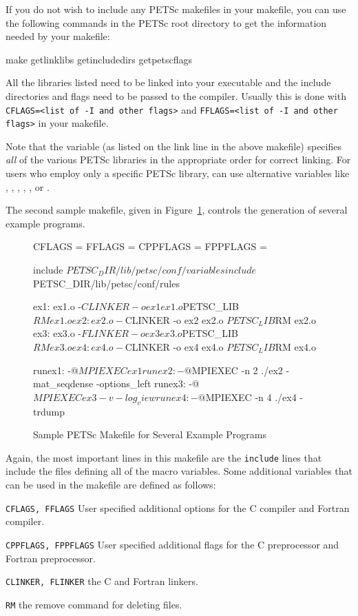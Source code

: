 {{If you do not wish to include any PETSc makefiles in your makefile,
you can use the following commands in the PETSc root directory to get the information
needed by your makefile: 
\begin{bashlisting}
make getlinklibs getincludedirs getpetscflags
\end{bashlisting}
All the libraries listed need to be linked into your executable and the
include directories and flags need to be passed to the compiler.
Usually this is done with \lstinline{CFLAGS=<list of -I and other flags>} and
\lstinline{FFLAGS=<list of -I and other flags>} in your makefile.

 
Note that the variable  (as listed on the link
line in the above makefile) specifies {\em all} of the various PETSc
libraries in the appropriate order for correct linking.  For users who
employ only a specific PETSc library, can use alternative variables
like  , ,
, ,
,  or
.

The second sample makefile, given in Figure~\ref{fig_make2},
controls the generation of several example programs.

\begin{figure}[H]
\begin{makelisting}
   CFLAGS   =
   FFLAGS   =
   CPPFLAGS =
   FPPFLAGS =

   include ${PETSC_DIR}/lib/petsc/conf/variables
   include ${PETSC_DIR}/lib/petsc/conf/rules

   ex1: ex1.o
        -${CLINKER} -o ex1 ex1.o  ${PETSC_LIB}
        ${RM} ex1.o
   ex2: ex2.o
        -${CLINKER} -o ex2 ex2.o  ${PETSC_LIB}
        ${RM} ex2.o
   ex3: ex3.o
        -${FLINKER} -o ex3 ex3.o  ${PETSC_LIB}
        ${RM} ex3.o
   ex4: ex4.o
        -${CLINKER} -o ex4 ex4.o  ${PETSC_LIB}
        ${RM} ex4.o

   runex1:
        -@${MPIEXEC} ex1
   runex2:
        -@${MPIEXEC} -n 2 ./ex2 -mat_seqdense -options_left
   runex3:
        -@${MPIEXEC} ex3 -v -log_view
   runex4:
        -@${MPIEXEC} -n 4 ./ex4 -trdump
\end{makelisting}
\caption{Sample PETSc Makefile for Several Example Programs}
\label{fig_make2}
\end{figure}

Again, the most important lines in this makefile are the \lstinline{include}
lines that include the files defining all of the macro variables.
Some additional variables that can be used in the makefile are defined
as follows:
\begin{tightitemize}
\item \lstinline{CFLAGS, FFLAGS} User specified additional options for the C compiler and
        Fortran compiler.
\item \lstinline{CPPFLAGS, FPPFLAGS} User specified additional flags for the C preprocessor
        and Fortran preprocessor.
\item \lstinline{CLINKER, FLINKER} the C and Fortran linkers.
\item \lstinline{RM} the remove command for deleting files.
\end{tightitemize}

}}
